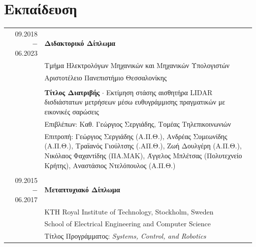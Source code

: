 \documentclass[a4paper,10pt,twoside]{article}
\begin{document}

\vspace*{\fill}
\section{Εκπαίδευση}

\begin{tabular}{rp{11cm}}
09.2018 $-$ 06.2023 & \textbf{Διδακτορικό Δίπλωμα} \\
                    & Τμήμα Ηλεκτρολόγων Μηχανικών και Μηχανικών Υπολογιστών \\
                    & Αριστοτέλειο Πανεπιστήμιο Θεσσαλονίκης \\

&\\                 & \textbf{Τίτλος Διατριβής} $\cdot$ Εκτίμηση στάσης αισθητήρα LIDAR δισδιάστατων μετρήσεων μέσω ευθυγράμμισης πραγματικών με εικονικές σαρώσεις\\
                    & Επιβλέπων: Καθ. Γεώργιος Σεργιάδης, Τομέας Τηλεπικοινωνιών\\
                    & Επιτροπή: Γεώργιος Σεργιάδης (Α.Π.Θ.), Ανδρέας Συμεωνίδης (Α.Π.Θ.), Τραϊανός Γιούλτσης (.ΑΠ.Θ.), Ζωή Δουλγέρη (Α.Π.Θ.), Νικόλαος Φαχαντίδης (ΠΑ.ΜΑΚ), Άγγελος Μπλέτσας (Πολυτεχνείο Κρήτης), Αναστάσιος Ντελόπουλος (Α.Π.Θ.) \\

&\\
09.2015 $-$ 06.2017 & \textbf{Μεταπτυχιακό Δίπλωμα} \\
                    & KTH Royal Institute of Technology, Stockholm, Sweden\\
                    & School of Electrical Engineering and Computer Science\\
                    & Τίτλος Προγράμματος: \textit{Systems, Control, and Robotics}\\


\end{tabular}
\end{document}
